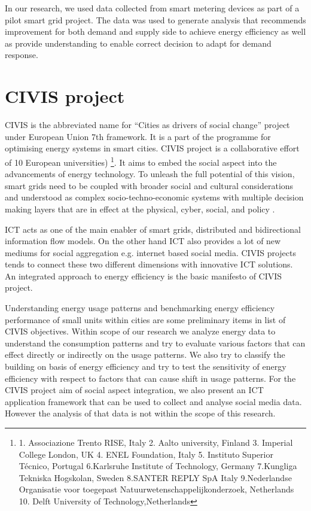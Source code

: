 In our research, we used data collected from smart metering devices as part of a pilot smart grid project. The data was used to generate analysis that recommends improvement for both demand and supply side to achieve energy efficiency as well as provide understanding to enable correct decision to adapt for demand response.


\section{CIVIS project}

CIVIS is the abbreviated name for ``Cities as drivers of social change'' project under European Union 7th framework. It is a part of the programme for optimising energy systems in smart cities. CIVIS project is a collaborative effort of 10 European universities) \footnote{1. Associazione Trento RISE, Italy 2. Aalto university, Finland 3. Imperial College London, UK 4. ENEL Foundation, Italy 5. Instituto Superior Técnico, Portugal 6.Karlsruhe Institute of Technology, Germany 7.Kungliga Tekniska Hogskolan, Sweden 8.SANTER REPLY SpA Italy 9.Nederlandse Organisatie voor toegepast Natuurwetenschappelijkonderzoek, Netherlands 10. Delft University of Technology,Netherlands  }. It aims to embed the social aspect into the advancements of energy technology. To unleash the full potential of this vision, smart grids need to be coupled with broader social and cultural considerations and understood as complex socio-techno-economic systems with multiple decision making layers that are in effect at the physical, cyber, social, and policy \cite{civisproposal}.

ICT acts as one of the main enabler of smart grids,  distributed  and bidirectional information flow models.  On the other hand ICT also provides a lot of new mediums for social aggregation e.g. internet based social media. CIVIS projects tends to connect these two different dimensions with innovative ICT solutions. An integrated approach to energy efficiency is the basic manifesto of CIVIS project. \cite{civisproposal}

Understanding energy usage patterns and benchmarking energy efficiency performance of small units within cities are some preliminary items in list of CIVIS objectives. Within scope of our research we analyze energy data to understand the consumption patterns and try to evaluate various factors that can effect directly or indirectly on the usage patterns. We also try to classify the building on basis of energy efficiency and try to test the sensitivity of energy efficiency with respect to factors that can cause shift in usage patterns. For the CIVIS project aim of social aspect integration, we also present an ICT application framework that can be used to collect and analyse social media data. However the analysis of that data is not within the scope of this research. 


